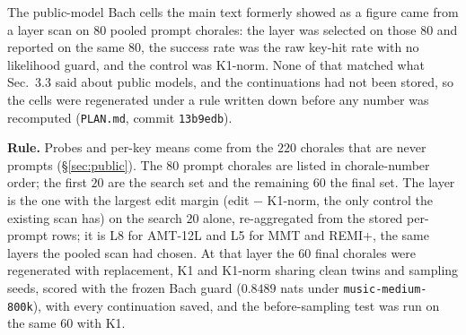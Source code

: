 \documentclass{article}
\begin{document}
%
The public-model Bach cells the main text formerly showed as a figure came from a
layer scan on $80$ pooled prompt chorales: the layer was selected on those $80$ and
reported on the same $80$, the success rate was the raw key-hit rate with no likelihood
guard, and the control was K1-norm. None of that matched what Sec.~3.3 said about
public models, and the continuations had not been stored, so the cells were regenerated
under a rule written down before any number was recomputed (\texttt{PLAN.md}, commit
\texttt{13b9edb}).

\textbf{Rule.} Probes and per-key means come from the $220$ chorales that are never
prompts (\S\ref{sec:public}). The $80$ prompt chorales are listed in chorale-number
order; the first $20$ are the search set and the remaining $60$ the final set. The
layer is the one with the largest edit margin (edit $-$ K1-norm, the only control the
existing scan has) on the search $20$ alone, re-aggregated from the stored per-prompt
rows; it is L8 for AMT-12L and L5 for MMT and REMI+, the same layers the pooled scan
had chosen. At that layer the $60$ final chorales were regenerated with replacement, K1
and K1-norm sharing clean twins and sampling seeds, scored with the frozen Bach guard
($0.8489$ nats under \texttt{music-medium-800k}), with every continuation saved, and
the before-sampling test was run on the same $60$ with K1.
\end{document}
